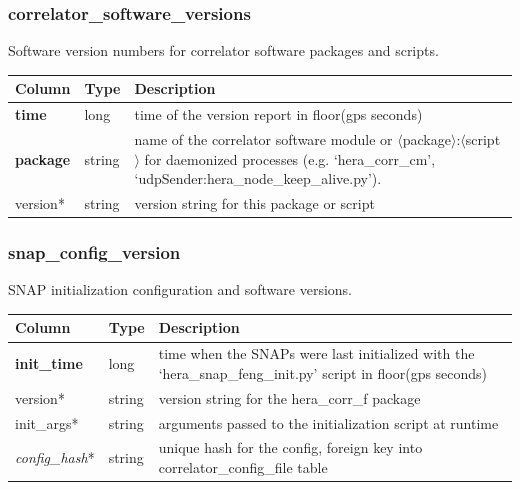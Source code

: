 \documentclass{article}
\begin{document}
{\subsubsection{correlator\_software\_versions}
Software version numbers for correlator software packages and scripts.
\begin{center}
 \begin{tabular}{| p{4cm} | p{2cm} | p{10cm} |}
\hline
 {\bf Column} & {\bf Type}  & {\bf Description} \\ [0.5ex]  \hline\hline
\textbf{time} & long & time of the version report in floor(gps seconds)\\ \hline
\textbf{package} & string & name of the correlator software module or $\langle$package$\rangle$:$\langle$script$\rangle$ for daemonized processes (e.g. `hera\_corr\_cm', `udpSender:hera\_node\_keep\_alive.py').  \\ \hline
version* & string & version string for this package or script \\\hline
\end{tabular}
\end{center}

\subsubsection{snap\_config\_version}
SNAP initialization configuration and software versions.
\begin{center}
 \begin{tabular}{| p{4cm} | p{2cm} | p{10cm} |}
\hline
 {\bf Column} & {\bf Type}  & {\bf Description} \\ [0.5ex]  \hline\hline
\textbf{init\_time} & long & time when the SNAPs were last initialized with the `hera\_snap\_feng\_init.py' script in floor(gps seconds)\\ \hline
version* & string & version string for the hera\_corr\_f package \\\hline
init\_args* & string & arguments passed to the initialization script at runtime \\\hline
\textit{config\_hash}* & string & unique hash for the config, foreign key into correlator\_config\_file table \\\hline
\end{tabular}
\end{center}

}
\end{document}
